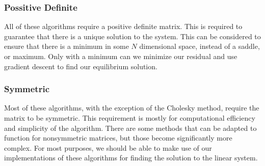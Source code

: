 \documentclass[../fem.tex]{subfiles}
\begin{document}
\begin{Figure}
   \begin{center}
     
   \end{center}
\end{Figure}

\subsubsection{Possitive Definite}%
\label{ssub:possitive_definite}

All of these algorithms require a positive definite matrix. This is required to
guarantee that there is a unique solution to the system. This can be considered
to ensure that there is a minimum in some $N$ dimensional space, instead of a
saddle, or maximum. Only with a minimum can we minimize our residual and use
gradient descent to find our equilibrium solution.

\subsubsection{Symmetric}%
\label{ssub:symmetric}

Most of these algorithms, with the exception of the Cholesky method, require the
matrix to be symmetric. This requirement is mostly for computational
efficiency and simplicity of the algorithm. There are some methods that can be
adapted to function for nonsymmetric matrices, but those become significantly
more complex. For most purposes, we should be able to make use of our
implementations of these algorithms for finding the solution to the linear
system.
\end{document}
